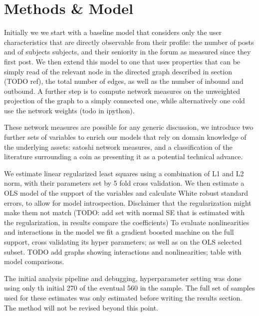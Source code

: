 
\section{Methods & Model}

Initially we we start with a baseline model that considers only the user characteristics that are directly observable from their profile: the number of posts and of subjects subjects, and their seniority in the forum as measured since they first post.
We then extend this model to one that uses properties that can be simply read of the relevant node in the directed graph described in section (TODO ref), the total number of edges, as well as the number of inbound and outbound.
A further step is to compute network measures on the unweighted projection of the graph to a simply connected one, while alternatively one cold use the network weights (todo in ipython). 

These network measures are possible for any generic discussion, we introduce two further sets of variables to enrich our models that rely on domain knowledge of the underlying assets: satoshi network measures, and a classification of the literature surrounding a coin as presenting it as a potential technical advance.

We estimate linear regularized least squares using a combination of L1 and L2 norm, with their parameters set by 5 fold cross validation. 
We then estimate a OLS model of the support of the variables and calculate White robust standard errors, to allow for model introspection. 
Disclaimer that the regularization might make them not match (TODO: add set with normal SE that is estimated with the regularization, in results compare the coefficients) 
To evaluate nonlinearities and interactions  in the model we fit a gradient boosted machine on the full support, cross validating its hyper parameters; as well as on the OLS selected subset.  TODO add graphs showing interactions and nonlinearities; table with model comparisons.


The initial analysis pipeline and debugging, hyperparameter setting was done using only th initial 270 of the eventual 560 in the sample. The full set of samples used for these estimates was only estimated before writing the results section. The method will not be revised beyond this point.

